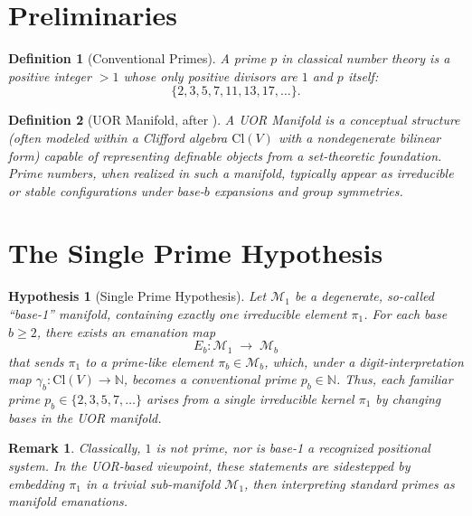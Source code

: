 \documentclass[11pt]{article}
\newtheorem{definition}{Definition}
\newtheorem{hypothesis}{Hypothesis}
\newtheorem{remark}{Remark}
\begin{document}
\section{Preliminaries}

\begin{definition}[Conventional Primes]
A \emph{prime} $p$ in classical number theory is a positive integer $>1$ 
whose only positive divisors are $1$ and $p$ itself:
\[
   \{2,3,5,7,11,13,17,\dots\}.
\]
\end{definition}

\begin{definition}[UOR Manifold, after \cite{UORTheoremUnity}]
A \emph{UOR Manifold} is a conceptual structure (often modeled within 
a Clifford algebra $\mathrm{Cl}(V)$ with a nondegenerate bilinear form) 
capable of representing definable objects from a set-theoretic foundation. 
Prime numbers, when realized in such a manifold, typically appear 
as irreducible or stable configurations under base-$b$ expansions 
and group symmetries.
\end{definition}

\section{The Single Prime Hypothesis}

\begin{hypothesis}[Single Prime Hypothesis]
\label{hyp:SinglePrime}
Let $\mathcal{M}_1$ be a degenerate, so-called ``base-1'' manifold, 
containing exactly one irreducible element $\pi_1$.  For each base 
$b \ge 2$, there exists an \emph{emanation map}
\[
  E_b : \mathcal{M}_1 \;\longrightarrow\; \mathcal{M}_b
\]
that sends $\pi_1$ to a prime-like element $\pi_b \in \mathcal{M}_b$, 
which, under a \emph{digit-interpretation} map $\gamma_b: \mathrm{Cl}(V)\to \mathbb{N}$, 
becomes a conventional prime $p_b \in \mathbb{N}$. Thus, each familiar 
prime $p_b \in \{2,3,5,7,\dots\}$ arises from a single irreducible kernel 
$\pi_1$ by changing bases in the UOR manifold.
\end{hypothesis}

\begin{remark}
Classically, $1$ is \emph{not} prime, nor is base-1 a recognized positional system.  
In the UOR-based viewpoint, these statements are sidestepped by embedding $\pi_1$ 
in a trivial sub-manifold $\mathcal{M}_1$, then interpreting standard primes 
as manifold emanations.
\end{remark}
\end{document}
